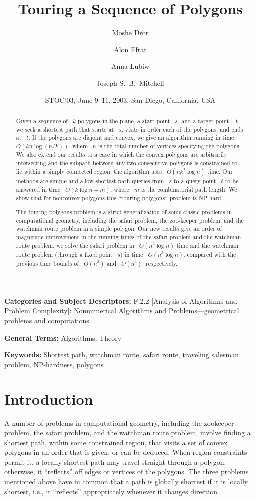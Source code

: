 \documentclass[11pt]{article}
\title{Touring a Sequence of Polygons}
\author[1]{Moshe Dror}
\author[1]{Alon Efrat}
\author[2]{Anna Lubiw}
\author[3]{Joseph S.\ B.\ Mitchell}
\affil[1]{The University of Arizona, Tucson AZ 85721 \\ \texttt{mdror@eller.arizona.edu}, \texttt{alon@cs.arizona.edu}}
\affil[2]{University of Waterloo, Waterloo, Ontario, Canada N2L 3G1 \\ \texttt{alubiw@uwaterloo.ca}}
\affil[3]{Stony Brook University, Stony Brook, NY 11794-3600 \\ \texttt{jsbm@ams.sunysb.edu}}
\date{STOC'03, June 9--11, 2003, San Diego, California, USA}
\begin{document}
\maketitle

\begin{abstract}
Given a sequence of ~\(k\) polygons in the plane, a start point ~\(s\), and a target point, ~\(t\), we seek a shortest path that starts at ~\(s\), visits in order each of the polygons, and ends at ~\(t\).
If the polygons are disjoint and convex, we give an algorithm running in time ~\(O(kn\log(n/k))\), where ~\(n\) is the total number of vertices specifying the polygons.
We also extend our results to a case in which the convex polygons are arbitrarily intersecting and the subpath between any two consecutive polygons is constrained to lie within a simply connected region; the algorithm uses ~\(O(nk^2\log n)\) time.
Our methods are simple and allow shortest path queries from ~\(s\) to a query point ~\(t\) to be answered in time ~\(O(k\log n + m)\), where ~\(m\) is the combinatorial path length.
We show that for nonconvex polygons this ``touring polygons'' problem is NP-hard.

The touring polygons problem is a strict generalization of some classic problems in computational geometry, including the safari problem, the zoo-keeper problem, and the watchman route problem in a simple polygon.
Our new results give an order of magnitude improvement in the running times of the safari problem and the watchman route problem: we solve the safari problem in ~\(O(n^2\log n)\) time and the watchman route problem (through a fixed point ~\(s\)) in time ~\(O(n^3\log n)\), compared with the previous time bounds of ~\(O(n^3)\) and ~\(O(n^4)\), respectively.
\end{abstract}

\noindent \textbf{Categories and Subject Descriptors:} F.2.2 [Analysis of Algorithms and Problem Complexity]: Nonnumerical Algorithms and Problems---geometrical problems and computations

\noindent \textbf{General Terms:} Algorithms, Theory

\noindent \textbf{Keywords:} Shortest path, watchman route, safari route, traveling salesman problem, NP-hardness, polygons

\section{Introduction}

A number of problems in computational geometry, including the zookeeper problem, the safari problem, and the watchman route problem, involve finding a shortest path, within some constrained region, that visits a set of convex polygons in an order that is given, or can be deduced.
When region constraints permit it, a locally shortest path may travel straight through a polygon; otherwise, it ``reflects'' off edges or vertices of the polygons.
The three problems mentioned above have in common that a path is globally shortest if it is locally shortest, i.e., it ``reflects'' appropriately whenever it changes direction.
\end{document}
